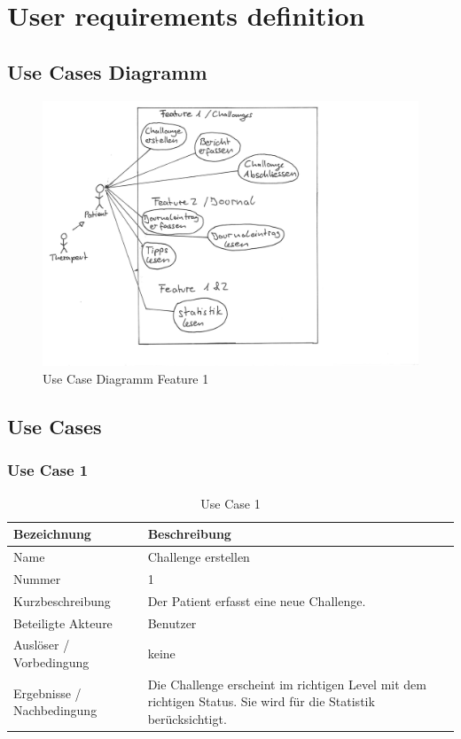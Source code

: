 \chapter{User requirements definition}

\section{Use Cases Diagramm}
\begin{figure}[H]
\includegraphics[width=1\textwidth]{UseCaseDiagramm.jpg}
\caption{Use Case Diagramm Feature 1}
\end{figure}

\section{Use Cases}

\subsection{Use Case 1}
\begin{table}[H]
 \caption{Use Case 1}
 \begin{tabularx}{\textwidth}{|l|X|}
     \hline
     \textbf{Bezeichnung}       & \textbf{Beschreibung} \\
     \hline
     Name                       & Challenge erstellen \\
     \hline
     Nummer                     & 1 \\
     \hline
     Kurzbeschreibung           & Der Patient erfasst eine neue Challenge. \\
     \hline
     Beteiligte Akteure         & Benutzer \\
     \hline
     Ausl\"{o}ser / Vorbedingung    & keine \\
     \hline
     Ergebnisse / Nachbedingung & Die Challenge erscheint im richtigen Level mit dem richtigen Status. Sie wird f\"{u}r die Statistik ber\"{u}cksichtigt. \\
     \hline
 \end{tabularx}
 \label{table: Use Case 1}
\end{table}

